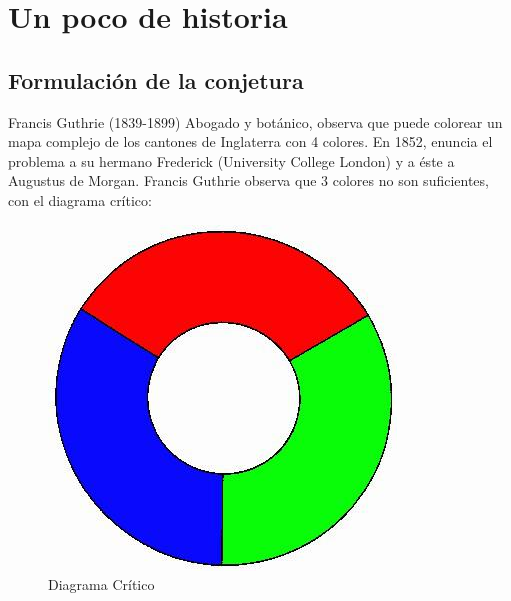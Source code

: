 \documentclass[spanish,utf8]{beamer}
\theoremstyle{definition}
\begin{document}
{
	\begin{frame}[plain]
\end{frame}
}

\section{Un poco de historia}

\subsection{Formulación de la conjetura}

\begin{frame}{\insertsection}\transblindsvertical
\begin{flushright}
	\begin{block}{Francis Guthrie (1839-1899)}
		Abogado y botánico, observa que puede colorear un mapa complejo de los cantones de Inglaterra con 4 colores. En 1852, enuncia el problema a su hermano Frederick (University College London) y a éste a Augustus de Morgan. Francis Guthrie observa que 3 colores no son suficientes, con el diagrama crítico:
	\end{block}
	\begin{figure}
		\includegraphics[scale=0.3]{diagrama.jpg}
		\caption{Diagrama Crítico}
	\end{figure}
\end{flushright}
\end{frame}
\end{document}
